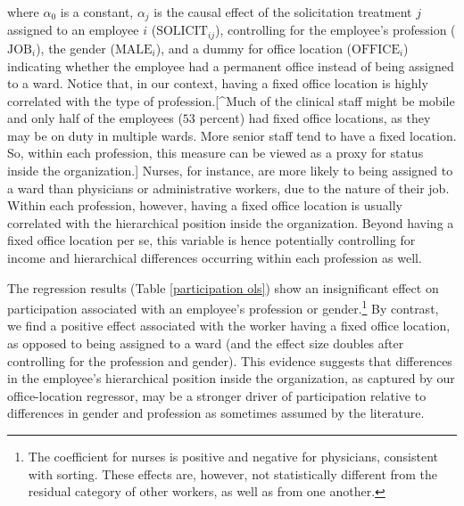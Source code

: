 \documentclass[12pt, titlepage]{article}
\begin{document}
where \(\alpha_0\) is a constant, \(\alpha_j\) is the causal effect of
the solicitation treatment \(j\) assigned to an employee \(i\)
(\(\text{SOLICIT}_{ij}\)), controlling for the employee's profession
(\(\text{JOB}_i\)), the gender (\(\text{MALE}_i\)), and a dummy for
office location (\(\text{OFFICE}_i\)) indicating whether the employee
had a permanent office instead of being assigned to a ward. Notice that,
in our context, having a fixed office location is highly correlated with
the type of profession.{[}\^{}Much of the clinical staff might be mobile
and only half of the employees (\(53\) percent) had fixed office
locations, as they may be on duty in multiple wards. More senior staff
tend to have a fixed location. So, within each profession, this measure
can be viewed as a proxy for status inside the organization.{]} Nurses,
for instance, are more likely to being assigned to a ward than
physicians or administrative workers, due to the nature of their job.
Within each profession, however, having a fixed office location is
usually correlated with the hierarchical position inside the
organization. Beyond having a fixed office location per se, this
variable is hence potentially controlling for income and hierarchical
differences occurring within each profession as well.



The regression results (Table \ref{participation ols}) show an
insignificant effect on participation associated with an employee's
profession or gender.\footnote{The coefficient for nurses is positive
  and negative for physicians, consistent with sorting. These effects
  are, however, not statistically different from the residual category
  of other workers, as well as from one another.} By contrast, we find a
positive effect associated with the worker having a fixed office
location, as opposed to being assigned to a ward (and the effect size
doubles after controlling for the profession and gender). This evidence
suggests that differences in the employee's hierarchical position inside
the organization, as captured by our office-location regressor, may be a
stronger driver of participation relative to differences in gender and
profession as sometimes assumed by the literature.
\end{document}
